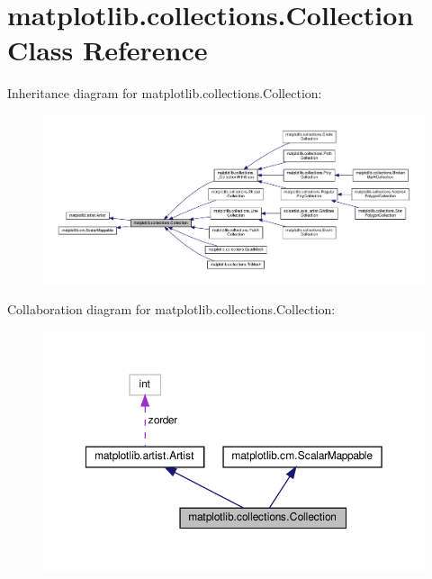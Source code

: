 \hypertarget{classmatplotlib_1_1collections_1_1Collection}{}\section{matplotlib.\+collections.\+Collection Class Reference}
\label{classmatplotlib_1_1collections_1_1Collection}


Inheritance diagram for matplotlib.\+collections.\+Collection\+:
\nopagebreak
\begin{figure}[H]
\begin{center}
\leavevmode
\includegraphics[width=350pt]{classmatplotlib_1_1collections_1_1Collection__inherit__graph}
\end{center}
\end{figure}


Collaboration diagram for matplotlib.\+collections.\+Collection\+:
\nopagebreak
\begin{figure}[H]
\begin{center}
\leavevmode
\includegraphics[width=350pt]{classmatplotlib_1_1collections_1_1Collection__coll__graph}
\end{center}
\end{figure}
